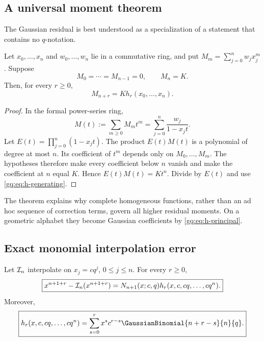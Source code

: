\subsection{A universal moment theorem}

The Gaussian residual is best understood as a specialization of a statement
that contains no $q$-notation.

\begin{theorem}
\label{gq:thm:universal-moment-residual}
Let $x_0,\ldots,x_n$ and $w_0,\ldots,w_n$ lie in a commutative ring, and put
$M_m=\sum_{j=0}^nw_jx_j^m$.  Suppose
\begin{equation}
 M_0=\cdots=M_{n-1}=0,
 \qquad M_n=K.
 \label{gq:eq:moment-residual-hypothesis}
\end{equation}
Then, for every $r\ge0$,
\begin{equation}
 M_{n+r}=K h_r(x_0,\ldots,x_n).
 \label{gq:eq:universal-moment-residual}
\end{equation}
\end{theorem}

\begin{proof}
In the formal power-series ring,
\[
 M(t):=\sum_{m\ge0}M_mt^m
 =\sum_{j=0}^n\frac{w_j}{1-x_jt}.
\]
Let $E(t)=\prod_{j=0}^n(1-x_jt)$.  The product $E(t)M(t)$ is a polynomial of
degree at most $n$.  Its coefficient of $t^m$ depends only on
$M_0,\ldots,M_m$.  The hypotheses therefore make every coefficient below
$n$ vanish and make the coefficient at $n$ equal $K$.  Hence
$E(t)M(t)=Kt^n$.  Divide by $E(t)$ and use
\eqref{gq:eq:h-generating}.
\end{proof}

The theorem explains why complete homogeneous functions, rather than an
ad hoc sequence of correction terms, govern all higher residual moments.
On a geometric alphabet they become Gaussian coefficients by
\eqref{gq:eq:h-principal}.

\subsection{Exact monomial interpolation error}

\begin{theorem}
\label{gq:thm:monomial-residual}
Let $\mathcal I_n$ interpolate on $x_j=cq^j$, $0\le j\le n$.  For every
$r\ge0$,
\begin{equation}
 \boxed{
 x^{n+1+r}-\mathcal I_n(x^{n+1+r})
 =N_{n+1}(x;c,q)h_r(x,c,cq,\ldots,cq^n).}
 \label{gq:eq:monomial-residual}
\end{equation}
Moreover,
\begin{equation}
 \boxed{
 h_r(x,c,cq,\ldots,cq^n)
 =\sum_{s=0}^rx^sc^{r-s}\GaussianBinomial{n+r-s}{n}{q}.}
 \label{gq:eq:geometric-h-with-x}
\end{equation}
\end{theorem}

